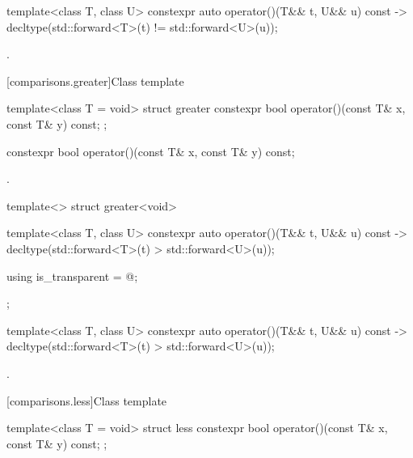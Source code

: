 %
\begin{itemdecl}
template<class T, class U> constexpr auto operator()(T&& t, U&& u) const
    -> decltype(std::forward<T>(t) != std::forward<U>(u));
\end{itemdecl}

\begin{itemdescr}
\pnum\returns {}.
\end{itemdescr}

[comparisons.greater]{Class template }

%
\begin{itemdecl}
template<class T = void> struct greater {
  constexpr bool operator()(const T& x, const T& y) const;
};
\end{itemdecl}

%
\begin{itemdecl}
constexpr bool operator()(const T& x, const T& y) const;
\end{itemdecl}

\begin{itemdescr}
\pnum\returns {}.
\end{itemdescr}

%
\begin{itemdecl}
template<> struct greater<void> {
  template<class T, class U> constexpr auto operator()(T&& t, U&& u) const
    -> decltype(std::forward<T>(t) > std::forward<U>(u));

  using is_transparent = @\unspec@;
};
\end{itemdecl}

%
\begin{itemdecl}
template<class T, class U> constexpr auto operator()(T&& t, U&& u) const
    -> decltype(std::forward<T>(t) > std::forward<U>(u));
\end{itemdecl}

\begin{itemdescr}
\pnum\returns {}.
\end{itemdescr}

[comparisons.less]{Class template }

%
\begin{itemdecl}
template<class T = void> struct less {
  constexpr bool operator()(const T& x, const T& y) const;
};
\end{itemdecl}


